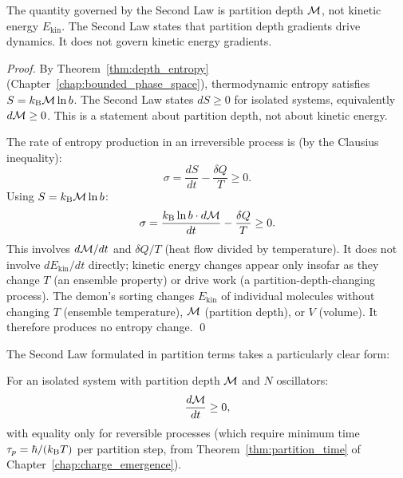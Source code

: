 \begin{proposition}
\label{prop:wrong_observable}
The quantity governed by the Second Law is partition depth $\mathcal{M}$, not kinetic
energy $E_{\mathrm{kin}}$. The Second Law states that partition depth gradients
drive dynamics. It does not govern kinetic energy gradients.
\end{proposition}

\begin{proof}
By Theorem~\ref{thm:depth_entropy} (Chapter~\ref{chap:bounded_phase_space}),
thermodynamic entropy satisfies $S = k_{\mathrm{B}} \mathcal{M} \ln b$. The Second Law states
$dS \geq 0$ for isolated systems, equivalently $d\mathcal{M} \geq 0$. This is a
statement about partition depth, not about kinetic energy.

The rate of entropy production in an irreversible process is (by the Clausius
inequality):
\begin{equation}
  \sigma = \frac{dS}{dt} - \frac{\delta Q}{T} \geq 0.
\end{equation}
Using $S = k_{\mathrm{B}} \mathcal{M} \ln b$:
\begin{equation}
  \sigma = \frac{k_{\mathrm{B}} \ln b \cdot d\mathcal{M}}{dt} - \frac{\delta Q}{T} \geq 0.
\end{equation}
This involves $d\mathcal{M}/dt$ and $\delta Q/T$ (heat flow divided by temperature).
It does not involve $dE_{\mathrm{kin}}/dt$ directly; kinetic energy changes
appear only insofar as they change $T$ (an ensemble property) or drive work
(a partition-depth-changing process). The demon's sorting changes $E_{\mathrm{kin}}$
of individual molecules without changing $T$ (ensemble temperature), $\mathcal{M}$
(partition depth), or $V$ (volume). It therefore produces no entropy change. \qed
\end{proof}

The Second Law formulated in partition terms takes a particularly clear form:

\begin{theorem}
\label{thm:second_law_partition}
For an isolated system with partition depth $\mathcal{M}$ and $N$ oscillators:
\begin{equation}
  \frac{d\mathcal{M}}{dt} \geq 0,
  \label{eq:second_law_partition}
\end{equation}
with equality only for reversible processes (which require minimum time
$\tau_p = \hbar/(k_{\mathrm{B}} T)$ per partition step, from Theorem~\ref{thm:partition_time}
of Chapter~\ref{chap:charge_emergence}).
\end{theorem}


